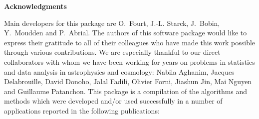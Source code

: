 
\newpage
\thispagestyle{empty}
$ $
\newpage

{\Huge \bf Acknowledgments}
\label{forewd}\\
\vspace{1cm}

Main developers for this package are  O.~Fourt, J.-L. Starck, J.~Bobin, Y.~Moudden and  P.~Abrial.
The authors of this software package would like to express their 
gratitude to all of their colleagues who have made this work  
possible through various contributions. 
We are especially thankful to our direct collaborators with whom we 
have been working for years on problems in statistics and data 
analysis in astrophysics and cosmology: Nabila Aghanim, Jacques Delabrouille, David Donoho, Jalal Fadili, 
Olivier Forni, Jiashun Jin, Mai Nguyen and Guillaume Patanchon.
This package is a compilation of the algorithms and methods which were 
developed and/or used successfully in a number of applications 
reported in the following publications: \\
